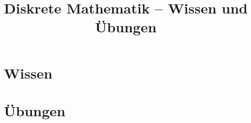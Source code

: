 
\usepackage[a4paper,margin=2cm]{geometry}
\title{Diskrete Mathematik -- Wissen und Übungen}
\date{}

\maketitle
\tableofcontents
\part{Wissen}











\part{Übungen}










